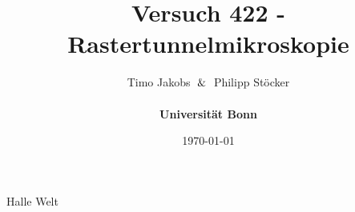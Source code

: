 \documentclass[a4paper]{scrartcl}
\title{Versuch 422 - Rastertunnelmikroskopie}
\author{Timo Jakobs $\And$ Philipp Stöcker \\\\ \textbf{Universität Bonn}}
\date{\today}
\begin{document}
\maketitle

Halle Welt
\end{document}
